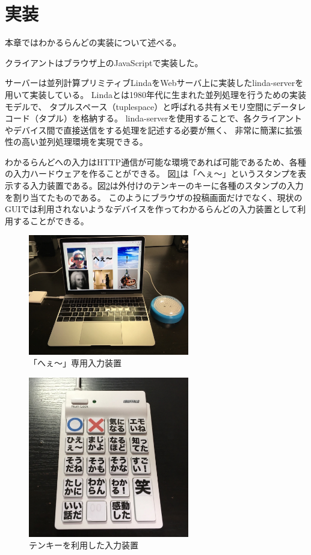 \section{実装}

本章ではわかるらんどの実装について述べる。

クライアントはブラウザ上のJavaScriptで実装した。

サーバーは並列計算プリミティブLindaをWebサーバ上に実装したlinda-serverを用いて実装している。
Lindaとは1980年代に生まれた並列処理を行うための実装モデルで、
タプルスペース（tuplespace）と呼ばれる共有メモリ空間にデータレコード（タプル）を格納する。
linda-serverを使用することで、各クライアントやデバイス間で直接送信をする処理を記述する必要が無く、
非常に簡潔に拡張性の高い並列処理環境を実現できる。

わかるらんどへの入力はHTTP通信が可能な環境であれば可能であるため、各種の入力ハードウェアを作ることができる。
図\ref{button}は「へぇ〜」というスタンプを表示する入力装置である。図\ref{10key}は外付けのテンキーのキーに各種のスタンプの入力を割り当てたものである。
このようにブラウザの投稿画面だけでなく、現状のGUIでは利用されないようなデバイスを作ってわかるらんどの入力装置として利用することができる。

\begin{figure}[h]
\centering
\includegraphics[width=7cm]{images/button.eps}
\caption{「へぇ〜」専用入力装置}
\label{button}
\end{figure}

\begin{figure}[h]
\centering
\includegraphics[width=7cm]{images/10key.eps}
\caption{テンキーを利用した入力装置}
\label{10key}
\end{figure}